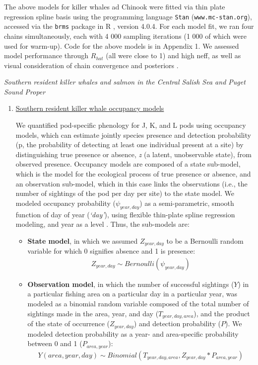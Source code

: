 \documentclass{article}
\begin{document}
The above models for killer whales ad Chinook were fitted via thin plate regression spline basis using the programming language \texttt{Stan} \citep{Carpenter:2016aa} (\texttt{www.mc-stan.org}), accessed via the \texttt{brms}\citep{brms2018} package in R \citep{Rcore2021}, version 4.0.4. For each model fit, we ran four chains simultaneously, each with 4 000 sampling iterations (1 000 of which were used for warm-up). Code for the above models is in Appendix 1. We assessed model performance through $R_{hat}$ (all were close to 1) and high neff, as well as visual consideration of chain convergence and posteriors \citep{BDA}.
\par \emph{Southern resident killer whales and salmon in the Central Salish Sea and Puget Sound Proper}
\begin{enumerate}
\item \underline {Southern resident killer whale occupancy models}
\par We quantified pod-specific phenology for J, K, and L pods using occupancy models, which can estimate jointly species presence and detection probability (p, the probability of detecting at least one individual present at a site) by distinguishing true presence or absence, \emph{z} (a latent, unobservable state), from observed presence. Occupancy models are composed of a state sub-model, which is the model for the ecological process of true presence or absence, and an observation sub-model, which in this case links the observations (i.e., the number of sightings of the pod per day per site) to the state model. We modeled occupancy probability ($\psi_{year,day}$) as a semi-parametric, smooth function of day of year (\emph{`day'}), using flexible thin-plate spline regression modeling, and year as a level \citep{strebel2014}. Thus, the sub-models are:
\begin{itemize}

\item \textbf{State model}, in which we assumed $Z_{year,day}$ to be a Bernoulli random variable for which 0 signifies absence and 1 is presence:
 \begin{align*}
Z_{year,day} \sim Bernoulli (\psi_{year,day})
\end{align*}
  \item \textbf{Observation model}, in which the number of successful sightings ($Y$) in a particular fishing area on a particular day in a particular year, was modeled as a binomial random variable composed of the total number of sightings made in the area, year, and day ($T_{year,day,area}$), and the product of the state of occurrence ($Z_{year,day}$) and detection probability ($P$). We modeled detection probability as a year- and area-specific probability between 0 and 1 ($P_{area,year}$):
\begin{align*}
Y(area,year,day) \sim Binomial (T_{year, day,area},Z_{year,day}*P_{area,year})
\end{align*}
                                                                             \end{itemize}                                                       


\end{enumerate}
\end{document}
